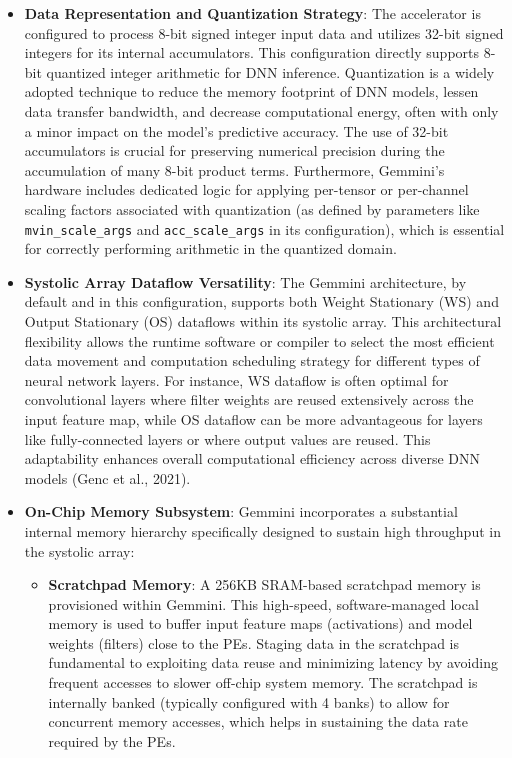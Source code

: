 \begin{itemize}
    \item \textbf{Data Representation and Quantization Strategy}: The accelerator is configured to process 8-bit signed integer input data and utilizes 32-bit signed integers for its internal accumulators. This configuration directly supports 8-bit quantized integer arithmetic for DNN inference. Quantization is a widely adopted technique to reduce the memory footprint of DNN models, lessen data transfer bandwidth, and decrease computational energy, often with only a minor impact on the model's predictive accuracy. The use of 32-bit accumulators is crucial for preserving numerical precision during the accumulation of many 8-bit product terms. Furthermore, Gemmini's hardware includes dedicated logic for applying per-tensor or per-channel scaling factors associated with quantization (as defined by parameters like \texttt{mvin\_scale\_args} and \texttt{acc\_scale\_args} in its configuration), which is essential for correctly performing arithmetic in the quantized domain.
    \item \textbf{Systolic Array Dataflow Versatility}: The Gemmini architecture, by default and in this configuration, supports both Weight Stationary (WS) and Output Stationary (OS) dataflows within its systolic array. This architectural flexibility allows the runtime software or compiler to select the most efficient data movement and computation scheduling strategy for different types of neural network layers. For instance, WS dataflow is often optimal for convolutional layers where filter weights are reused extensively across the input feature map, while OS dataflow can be more advantageous for layers like fully-connected layers or where output values are reused. This adaptability enhances overall computational efficiency across diverse DNN models (Genc et al., 2021).
    \item \textbf{On-Chip Memory Subsystem}: Gemmini incorporates a substantial internal memory hierarchy specifically designed to sustain high throughput in the systolic array:
        \begin{itemize}
            \item \textbf{Scratchpad Memory}: A 256KB SRAM-based scratchpad memory is provisioned within Gemmini. This high-speed, software-managed local memory is used to buffer input feature maps (activations) and model weights (filters) close to the PEs. Staging data in the scratchpad is fundamental to exploiting data reuse and minimizing latency by avoiding frequent accesses to slower off-chip system memory. The scratchpad is internally banked (typically configured with 4 banks) to allow for concurrent memory accesses, which helps in sustaining the data rate required by the PEs.

\end{itemize}
\end{itemize}
